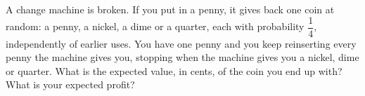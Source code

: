 A change machine is broken. If you put in a penny, it gives back one coin at random: a penny, a nickel, a dime or a quarter, each with probability $\dfrac{1}{4}$, independently of earlier uses. You have one penny and you keep reinserting every penny the machine gives you, stopping when the machine gives you a nickel, dime or quarter. What is the expected value, in cents, of the coin you end up with? What is your expected profit?
